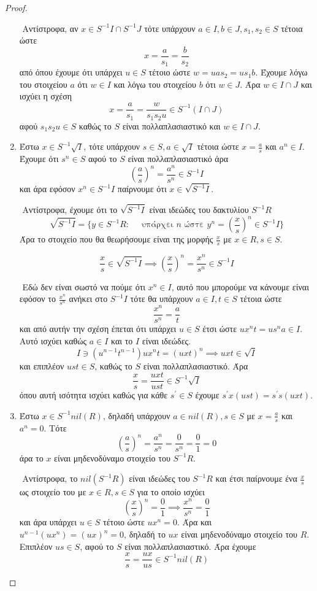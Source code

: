 \documentclass[oneside,a4paper]{article}
\begin{document}
\begin{proof}
\begin{enumerate}
		$ $\newline
		Αντίστροφα, αν $x \in S^{-1}I \cap S^{-1}J$ τότε υπάρχουν $a \in I, b \in J, s_1,s_2 \in S$ τέτοια ώστε
		$$x = \frac{a}{s_1} = \frac{b}{s_2}$$
		από όπου έχουμε ότι υπάρχει $u \in S$ τέτοιο ώστε $w = uas_2 = u s_1 b$. Έχουμε λόγω του στοιχείου $a$ ότι $w \in I$ και λόγω του στοιχείου $b$ ότι $w \in J$. Άρα $w \in I\cap J$ και ισχύει η σχέση
		$$ x= \frac{a}{s_1} = \frac{w}{s_1 s_2 u} \in S^{-1}(I\cap J)$$
		αφού $s_1 s_2 u \in S$ καθώς το $S$ είναι πολλαπλασιαστικό και $w \in I\cap J$.


		\item Έστω $x \in S^{-1} \sqrt{I}$, τότε υπάρχουν $s \in S, a \in \sqrt{I}$ τέτοια ώστε $x= \frac as$ και $a^n \in I$. Έχουμε ότι $s^n \in S$ αφού το $S$ είναι πολλαπλασιαστικό άρα
		$$\left(\frac as\right)^n = \frac{a^n}{s^n} \in S^{-1}I$$
		και άρα εφόσον $x^n \in S^{-1} I$ παίρνουμε ότι $x \in \sqrt{S^{-1} I}$.

		$ $\newline
		Αντίστροφα, έχουμε ότι το $\sqrt{S^{-1}I}$ είναι ιδεώδες του δακτυλίου $S^{-1} R$
		$$\sqrt{S^{-1} I} = \{y \in S^{-1}R: \quad \text{ υπάρχει } n \text{ ώστε } y^n = \left(\frac xs \right)^n \in S^{-1} I\}$$
		Άρα το στοιχείο που θα θεωρήσουμε είναι της μορφής $\frac xs$ με $x \in R, s \in S$.

		$$\frac xs \in \sqrt{S^{-1}I} \implies \left(\frac xs\right)^n = \frac{x^n}{s^n} \in S^{-1}I$$

		$ $\newline
		Εδώ δεν είναι σωστό να πούμε ότι $x^n \in I$, αυτό που μπορούμε να κάνουμε είναι εφόσον το $\frac{x^n}{s^n}$ ανήκει στο $S^{-1}I$ τότε θα υπάρχουν $a \in I, t \in S$ τέτοια ώστε
		$$\frac{x^n}{s^n} = \frac at$$
		και από αυτήν την σχέση έπεται ότι υπάρχει $u \in S$ έτσι ώστε $ux^n t = us^n a \in I$. Αυτό ισχύει καθώς $a \in I$ και το $I$ είναι ιδεώδες. 
		$$ I \ni (u^{n-1} t^{n-1}) ux^n t = (uxt)^n \implies uxt \in \sqrt{I}$$
		και επιπλέον $ust \in S$, καθώς το $S$ είναι πολλαπλασιαστικό. Άρα
		$$\frac xs = \frac{uxt}{ust} \in S^{-1} \sqrt{I}$$
		όπου αυτή ισότητα ισχύει καθώς για κάθε $s^{\prime} \in S$ έχουμε $s^{\prime} x (ust) = s^{\prime} s (uxt)$.



		\item Έστω $x \in S^{-1} nil(R)$, δηλαδή υπάρχουν $a \in nil(R), s \in S$ με $x = \frac as$ και $a^n = 0$. Τότε
		$$\left(\frac as\right)^n = \frac {a^n}{s^n} = \frac 0{s^n} = \frac 01 = 0$$
		άρα το $x$ είναι μηδενοδύναμο στοιχείο του $S^{-1}R$.

		$ $\newline
		Αντίστροφα, το $nil(S^{-1}R)$ είναι ιδεώδες του $S^{-1}R$ και έτσι παίρνουμε ένα $\frac xs$ ως στοιχείο του με $x \in R, s \in S$ για το οποίο ισχύει
		$$\left(\frac xs\right)^n = \frac 01 \implies \frac{x^n}{s^n} = \frac 01$$
		και άρα υπάρχει $u \in S$ τέτοιο ώστε $ux^n = 0$. Άρα και $u^{n-1}(ux^n) = (ux)^n = 0$, δηλαδή το $ux$ είναι μηδενοδύναμο στοιχείο του $R$. Επιπλέον $us \in S$, αφού το $S$ είναι πολλαπλασιαστικό. Άρα έχουμε
		$$\frac xs = \frac {ux}{us} \in S^{-1} nil(R)$$
	\end{enumerate}
\end{proof}
\pagebreak
\end{document}

